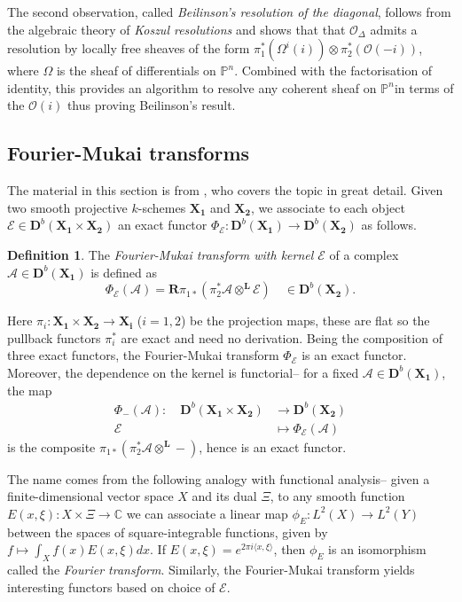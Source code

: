 \documentclass[a4paper]{article}
\theoremstyle{definition}
\newtheorem{defn}{Definition}[section]
\theoremstyle{remark}
\newcommand{\deri}{\mathbf{D}}
\newcommand{\deritensor}{\ensuremath{\otimes^\mathbf{L}}}
\newcommand{\Pn}{\ensuremath{{\mathbb{P}^n}}}
\begin{document}
The second observation, called \textit{Beilinson's resolution of the diagonal},
follows from the algebraic theory of \textit{Koszul resolutions} and shows that
that \(\mathscr{O}_\Delta\) admits a resolution by locally free sheaves of the
form \(\pi_1^\ast(\Omega^i(i))\otimes \pi_2^\ast (\mathscr{O}(-i))\), where
\(\Omega\) is the sheaf of differentials on \Pn. Combined with the factorisation
of identity, this provides an algorithm to resolve any coherent sheaf on \Pn in
terms of the \(\mathscr{O}(i)\) thus proving Beilinson's result.

\subsection{Fourier-Mukai transforms}\label{fouriermukai}

The material in this section is from ,
who covers the topic in great detail. Given two smooth projective \(k\)-schemes
\(\mathbf{X_1}\) and \(\mathbf{X_2}\), we associate to each object
\(\mathscr{E}\in \deri^b(\mathbf{X_1}\times \mathbf{X_2})\) an exact functor
\(\Phi_\mathscr{E}: \deri^b(\mathbf{X_1})\rightarrow \deri^b(\mathbf{X_2})\) as
follows. 

\begin{defn} The \textit{Fourier-Mukai transform with kernel \(\mathscr{E}\)} of
    a complex \(\mathscr{A}\in \deri^b(\mathbf{X_1})\) is defined as 
    \[\Phi_\mathscr{E}(\mathscr{A})= \mathbf{R}\pi_{1\ast}(\pi_2^\ast
    \mathscr{A}\deritensor \mathscr{E}) \quad \in \deri^b(\mathbf{X_2}).\]
\end{defn}

Here \(\pi_i: \mathbf{X_1}\times \mathbf{X_2}\rightarrow \mathbf{X_i}\)
(\(i=1,2\)) be the projection maps, these are flat so the pullback functors
\(\pi_i^\ast\) are exact and need no derivation. Being the composition of three
exact functors, the Fourier-Mukai transform \(\Phi_\mathscr{E}\) is an exact
functor. Moreover, the dependence on the kernel is functorial-- for a fixed \(\mathscr{A}\in \deri^b(\mathbf{X_1})\), the map
\begin{align*} 
    \Phi_-(\mathscr{A}):\quad \deri^b(\mathbf{X_1}\times \mathbf{X_2})
    &\longrightarrow \deri^b(\mathbf{X_2})\\
    \mathscr{E}&\longmapsto \Phi_\mathscr{E}(\mathscr{A})
\end{align*}
is the composite \(\pi_{1\ast}(\pi_2^\ast\mathscr{A}\deritensor -)\), hence is
an exact functor. 

The name comes from the following analogy with functional analysis-- given a
finite-dimensional vector space \(X\) and its dual \(\Xi\), to any smooth
function \(E(x,\xi): X\times \Xi \rightarrow \mathbb{C}\) we can associate a
linear map \({\phi_E: L^2(X)\rightarrow L^2(Y)}\) between the spaces of
square-integrable functions, given by \({f\mapsto \int_X f(x)E(x,\xi)dx}\). If
\({E(x,\xi)= e^{2\pi i \langle x,\xi\rangle}}\), then \(\phi_E\) is an
isomorphism called the \textit{Fourier transform}. Similarly, the Fourier-Mukai
transform yields interesting functors based on choice of \(\mathscr{E}\).
\end{document}
